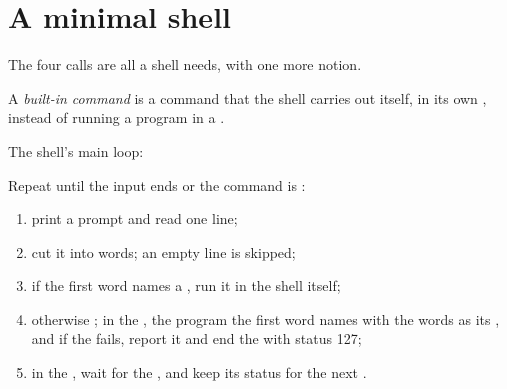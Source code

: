 \section{A minimal shell}\label{sec:b2:processes-and-system-calls:shell}

The four calls are all a shell needs, with one more notion.

\begin{definition}\label{def:b2:processes-and-system-calls:builtin}
A \emph{built-in command} is a command that the shell carries out itself, in its own
, instead of running a program in a .
\end{definition}

The shell's main loop:

\begin{method}\label{met:b2:processes-and-system-calls:shell-loop}
Repeat until the input ends or the command is :
\begin{enumerate}
\item print a prompt and read one line;
\item cut it into words; an empty line is skipped;
\item if the first word names a , run it in the shell itself;
\item otherwise ; in the ,  the program the first word names with the words as its , and
if the  fails, report it and end the  with status 127;
\item in the , wait for the , and keep its status for the next .
\end{enumerate}
\end{method}

